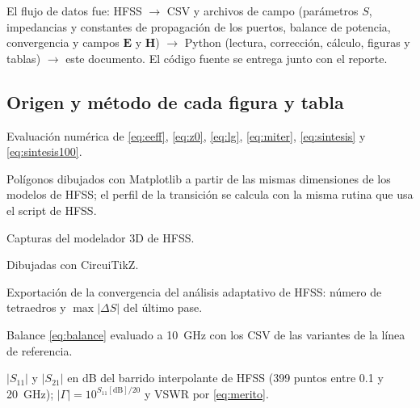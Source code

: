\documentclass[11pt,letterpaper]{article}
\begin{document}
El flujo de datos fue: HFSS $\rightarrow$ CSV y archivos de campo (parámetros $S$, impedancias y constantes de propagación de los puertos, balance de potencia, convergencia y campos $\mathbf{E}$ y $\mathbf{H}$) $\rightarrow$ Python (lectura, corrección, cálculo, figuras y tablas) $\rightarrow$ este documento. El código fuente se entrega junto con el reporte.

\subsection{Origen y método de cada figura y tabla}
\begin{description}[style=nextline,leftmargin=0pt,itemsep=4pt,font=\normalfont\bfseries]
\item[Sección~\ref{sec:diseno} (diseño de las líneas)] Evaluación numérica de \eqref{eq:eeff}, \eqref{eq:z0}, \eqref{eq:lg}, \eqref{eq:miter}, \eqref{eq:sintesis} y \eqref{eq:sintesis100}.

\item[Figuras~\ref{fig:geo}, \ref{fig:dgeo}, \ref{fig:d3geo}, \ref{fig:d4geo} y~\ref{fig:d5geo} (geometría)] Polígonos dibujados con Matplotlib a partir de las mismas dimensiones de los modelos de HFSS; el perfil de la transición se calcula con la misma rutina que usa el script de HFSS.

\item[Figuras~\ref{fig:hfss3d}, \ref{fig:dhfss}, \ref{fig:d3hfss}, \ref{fig:d4hfss} y~\ref{fig:d5hfss} (modelos 3D)] Capturas del modelador 3D de HFSS.

\item[Figuras~\ref{fig:circescalon}, \ref{fig:circgap} y~\ref{fig:circt} (circuitos)] Dibujadas con CircuiTikZ.

\item[Tabla~\ref{tab:conv} (convergencia)] Exportación de la convergencia del análisis adaptativo de HFSS: número de tetraedros y $\max|\Delta S|$ del último pase.

\item[Tabla~\ref{tab:diag} (diagnóstico)] Balance \eqref{eq:balance} evaluado a \SI{10}{GHz} con los CSV de las variantes de la línea de referencia.

\item[Figuras~\ref{fig:s11}, \ref{fig:gamma} y \ref{fig:s21}; Tabla~\ref{tab:sparam}] $|S_{11}|$ y $|S_{21}|$ en dB del barrido interpolante de HFSS (399 puntos entre \SI{0.1}{} y \SI{20}{GHz}); $|\Gamma|=10^{S_{11}[\mathrm{dB}]/20}$ y VSWR por \eqref{eq:merito}.


\end{description}
\end{document}
